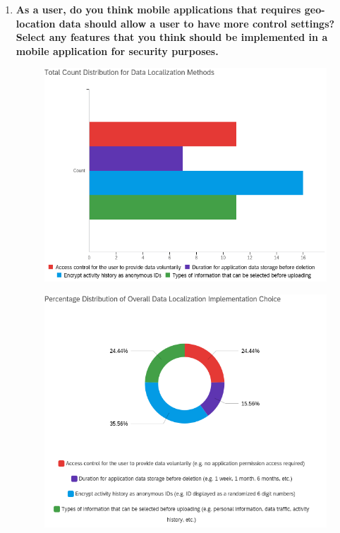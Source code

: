 \begin{enumerate}
\begin{figure}[H]
  \end{figure}
  \item \textbf{As a user, do you think mobile applications that requires geo-location data should allow a user to have more control settings? Select any features that you think should be implemented in a mobile application for security purposes.}
  \begin{figure}[H]
    \centering
    \includegraphics[width=\linewidth]{img/prototype/app3-10.png}
  \end{figure}
  \begin{figure}[H]
    \centering
    \includegraphics[width=\linewidth]{img/prototype/app3-11.png}

\end{figure}
\end{enumerate}
